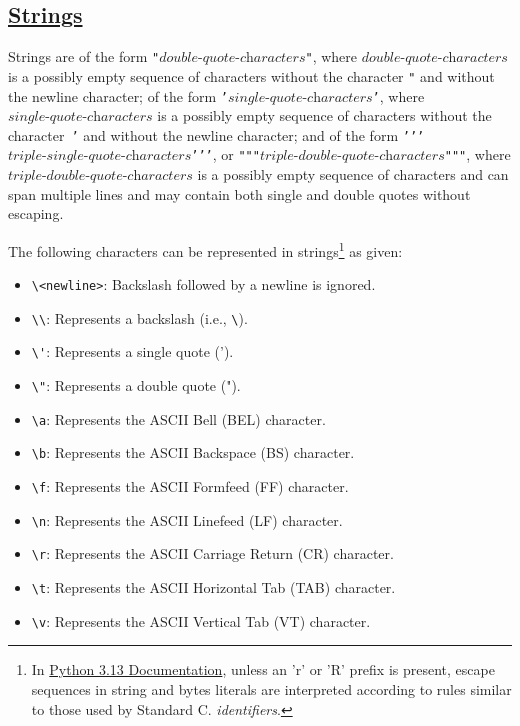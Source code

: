 \subsection*{\href{https://sourceacademy.org/sicpy/2.3.1}{Strings}}

Strings are of the form \texttt{"}$ \textit{double-quote-characters}
$\texttt{"}, where $\textit{double-quote-characters}$ is a possibly
empty sequence of characters without the character \texttt{"} and
without the newline character; of the form \texttt{'}$
\textit{single-quote-characters} $\texttt{'}, where
$\textit{single-quote-characters}$ is a possibly empty sequence of
characters without the character~\texttt{'} and without the newline
character; and of the form
\texttt{'}\texttt{'}\texttt{'}$\textit{triple-single-quote-characters}$\texttt{'}\texttt{'}\texttt{'},
or
\texttt{"""}$\textit{triple-double-quote-characters}$\texttt{"""},
where \\ $\textit{triple-double-quote-characters}$ is a possibly
empty sequence of
characters and can span multiple lines and may contain both single
and double quotes without escaping.

The following characters can be represented in strings\footnote{
  In \href{https://docs.python.org/3/reference/lexical_analysis.html}{
  \color{DarkBlue} Python 3.13 Documentation},
  unless an 'r' or 'R' prefix is present, escape sequences in string
  and bytes literals are interpreted according to rules similar to
  those used by Standard C. \emph{identifiers}.
} as given:
\begin{itemize}
    \item \verb|\<newline>|: Backslash followed by a newline is ignored.
    \item \verb|\\|: Represents a backslash (i.e., \texttt{\textbackslash}).
    \item \verb|\'|: Represents a single quote (').
    \item \verb|\"|: Represents a double quote (").
    \item \verb|\a|: Represents the ASCII Bell (BEL) character.
    \item \verb|\b|: Represents the ASCII Backspace (BS) character.
    \item \verb|\f|: Represents the ASCII Formfeed (FF) character.
    \item \verb|\n|: Represents the ASCII Linefeed (LF) character.
    \item \verb|\r|: Represents the ASCII Carriage Return (CR) character.
    \item \verb|\t|: Represents the ASCII Horizontal Tab (TAB) character.
    \item \verb|\v|: Represents the ASCII Vertical Tab (VT) character.
\end{itemize}
